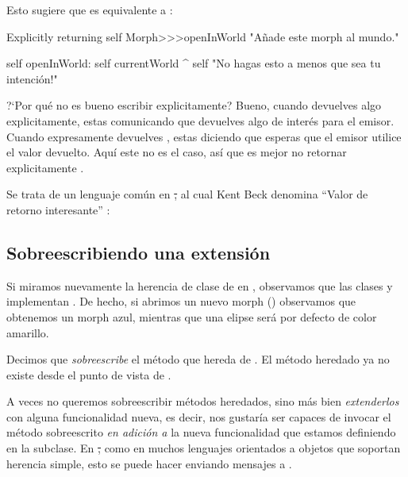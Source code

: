 \documentclass[a4paper,10pt,twoside]{book}
\begin{document}
Esto sugiere que  es equivalente a :

\begin{method}[openInWorldReturnSelf]{Explicitly returning self}
Morph>>>openInWorld
	"A\~nade este morph al mundo."

    self openInWorld: self currentWorld
	^ self		"No hagas esto a menos que sea tu intenci\'on!"
\end{method}

?`Por qu\'e no es bueno escribir  explicitamente?
Bueno, cuando devuelves algo explicitamente, estas comunicando que devuelves algo de inter\'es para el emisor.
Cuando expresamente devuelves \self, estas diciendo que esperas que el emisor utilice el valor devuelto.
Aqu\'i este no es el caso, as\'i que es mejor no retornar explicitamente \self.

Se trata de un lenguaje com\'un en \st, al cual Kent Beck denomina ``Valor de retorno interesante'' \cite{Beck97a}:


\subsection{Sobreescribiendo una extensi\'on}

Si miramos nuevamente la herencia de clase de  en , observamos que las clases  y \mbox{} implementan .
De hecho, si abrimos un nuevo morph () observamos que obtenemos un morph azul, mientras que una elipse ser\'a por defecto de color amarillo.

Decimos que  \emph{sobreescribe} el m\'etodo  que hereda de .
El m\'etodo heredado ya no existe desde el punto de vista de .

A veces no queremos sobreescribir m\'etodos heredados, sino m\'as bien \emph{extenderlos} con alguna funcionalidad nueva, es decir, nos gustar\'ia ser capaces de invocar el m\'etodo sobreescrito \emph{en adici\'on a} la nueva funcionalidad que estamos definiendo en la subclase.
En \st, como en  muchos lenguajes orientados a objetos que soportan herencia simple, esto se puede hacer enviando mensajes a \super.
\end{document}

